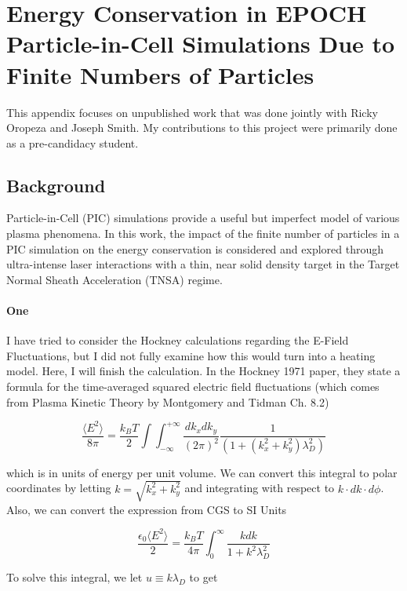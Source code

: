 \chapter{Energy Conservation in EPOCH Particle-in-Cell Simulations Due to Finite Numbers of Particles}
This appendix focuses on unpublished work that was done jointly with Ricky Oropeza and Joseph Smith. My contributions to this project were primarily done as a pre-candidacy student.

\section{Background}

Particle-in-Cell (PIC) simulations provide a useful but imperfect model of various plasma phenomena. In this work, the impact of the finite number of particles in a PIC simulation on the energy conservation is considered and explored through ultra-intense laser interactions with a thin, near solid density target in the Target Normal Sheath Acceleration (TNSA) regime. 

\subsubsection{One}
I have tried to consider the Hockney calculations regarding the E-Field Fluctuations, but I did not fully examine how this would turn into a heating model. Here, I will finish the calculation. In the Hockney 1971 paper, they state a formula for the time-averaged squared electric field fluctuations (which comes from Plasma Kinetic Theory by Montgomery and Tidman Ch. 8.2)

\begin{equation} 
	\frac{\langle E^2 \rangle}{8 \pi} = \frac{k_B T}{2} \int \int_{-\infty}^{+\infty} \frac{d k_x d k_y}{(2 \pi)^2} \frac{1}{(1 + (k_x^2 + k_y^2) \lambda_D^2)} 
\end{equation}

which is in units of energy per unit volume. We can convert this integral to polar coordinates by letting $k = \sqrt{k_x^2 + k_y^2}$ and integrating with respect to $k \cdot dk \cdot d\phi$. Also, we can convert the expression from CGS to SI Units

\begin{equation}
	\frac{\epsilon_0 \langle E^2 \rangle}{2} = \frac{k_B T}{4 \pi} \int_0^\infty \frac{k dk}{1 + k^2 \lambda_D^2}
\end{equation}

To solve this integral, we let $u \equiv k \lambda_D$ to get

